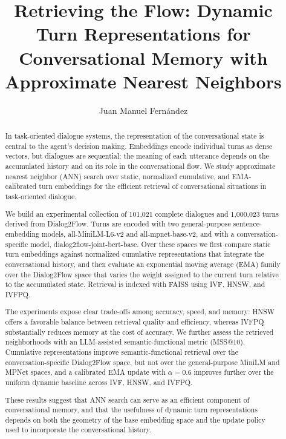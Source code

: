 \documentclass[runningheads]{llncs}
\begin{document}
\title{Retrieving the Flow: Dynamic Turn Representations for Conversational Memory with Approximate Nearest Neighbors}


\author{Juan Manuel Fernández}

\maketitle

\begin{abstract}
In task-oriented dialogue systems, the representation of the conversational state is central to the agent's decision making. Embeddings encode individual turns as dense vectors, but dialogues are sequential: the meaning of each utterance depends on the accumulated history and on its role in the conversational flow. We study approximate nearest neighbor (ANN) search over static, normalized cumulative, and EMA-calibrated turn embeddings for the efficient retrieval of conversational situations in task-oriented dialogue.

We build an experimental collection of 101{,}021 complete dialogues and 1{,}000{,}023 turns derived from Dialog2Flow. Turns are encoded with two general-purpose sentence-embedding models, all-MiniLM-L6-v2 and all-mpnet-base-v2, and with a conversation-specific model, dialog2flow-joint-bert-base. Over these spaces we first compare static turn embeddings against normalized cumulative representations that integrate the conversational history, and then evaluate an exponential moving average (EMA) family over the Dialog2Flow space that varies the weight assigned to the current turn relative to the accumulated state. Retrieval is indexed with FAISS using IVF, HNSW, and IVFPQ.

The experiments expose clear trade-offs among accuracy, speed, and memory: HNSW offers a favorable balance between retrieval quality and efficiency, whereas IVFPQ substantially reduces memory at the cost of accuracy. We further assess the retrieved neighborhoods with an LLM-assisted semantic-functional metric (MSS@10). Cumulative representations improve semantic-functional retrieval over the conversation-specific Dialog2Flow space, but not over the general-purpose MiniLM and MPNet spaces, and a calibrated EMA update with $\alpha=0.6$ improves further over the uniform dynamic baseline across IVF, HNSW, and IVFPQ.

These results suggest that ANN search can serve as an efficient component of conversational memory, and that the usefulness of dynamic turn representations depends on both the geometry of the base embedding space and the update policy used to incorporate the conversational history.


\end{abstract}
\end{document}
